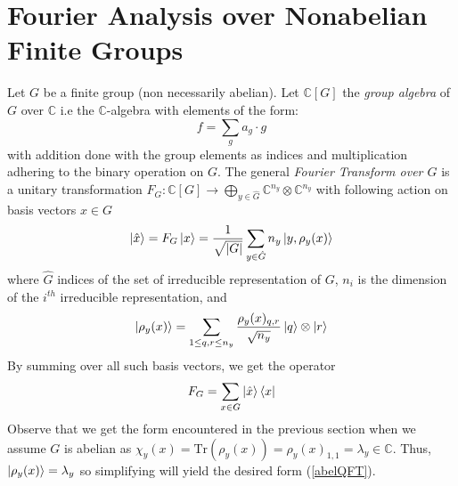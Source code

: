 \documentclass{../quantum.tex}
\begin{document}
\section{Fourier Analysis over Nonabelian Finite Groups}

Let $G$ be a finite group (non necessarily abelian).
Let $\mathbb{C}[G]$ the \textit{group algebra} of $G$ over $\mathbb{C}$ i.e the $\mathbb{C}$-algebra with elements of the form:
$$ f = \sum_g a_g \cdot g $$ with addition done with the group elements as indices and multiplication adhering to the binary operation on $G$. The general \textit{Fourier Transform over $G$} is a unitary transformation $F_G: \mathbb{C}[G] \rightarrow \bigoplus_{y \in \hat{G}} \mathbb{C}^{n_y} \otimes \mathbb{C}^{n_y}$ with following action on basis vectors $x \in G$
%
\begin{equation}
  \ket{\hat{x}} = F_G\ket{x} = \frac{1}{\sqrt{|G|}}\sum_{y \in \hat{G}} n_y \ket{y, \rho_y(x)}
\end{equation}
where $\hat{G}$ indices of the set of irreducible representation of $G$, $n_i$ is the dimension of the $i^{th}$ irreducible representation, and
\begin{equation}
  \ket{\rho_y(x)} = \sum_{1 \leq q,r \leq n_y} \frac{\rho_y(x)_{q,r}}{\sqrt{n_y}} \ket{q} \otimes \ket{r}
\end{equation}
%
By summing over all such basis vectors, we get the operator
$$ F_G = \sum_{x \in G} \ket{\hat{x}}\bra{x} $$
%
Observe that we get the form encountered in the previous section when we assume $G$ is abelian as $\chi_y(x) = \text{Tr}(\rho_y(x)) = \rho_y(x)_{1,1} = \lambda_y \in \mathbb{C}$. Thus, $\ket{\rho_y(x)} = \lambda_y$ so simplifying will yield the desired form (\ref{abelQFT}).
%
\end{document}
